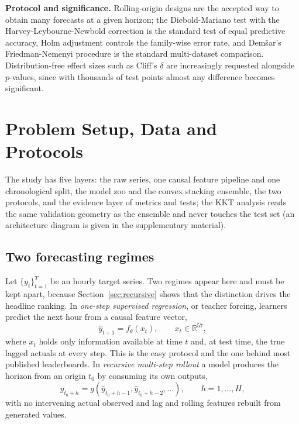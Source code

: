 \documentclass[journal]{IEEEtran}
\newif\iffullversion
\begin{document}
\textbf{Protocol and significance.} Rolling-origin designs \cite{r27} are the accepted way to obtain many forecasts at a given horizon; the Diebold-Mariano test \cite{r22} with the Harvey-Leybourne-Newbold correction \cite{r23} is the standard test of equal predictive accuracy, Holm adjustment \cite{r26} controls the family-wise error rate, and Dem\v{s}ar's Friedman-Nemenyi procedure \cite{r24} is the standard multi-dataset comparison. Distribution-free effect sizes such as Cliff's $\delta$ \cite{r25} are increasingly requested alongside $p$-values, since with thousands of test points almost any difference becomes significant.

\iffullversion\fi

\section{Problem Setup, Data and Protocols}
\label{sec:setup}
\iffullversion Fig.~\ref{fig:arch} gives the architecture of the study. Panel (a) shows the five layers, from the raw series to the evidence, with the object that passes between them on each arrow; no arrow carries test data backwards. Panel (b) opens the convex stacking ensemble and the KKT analysis that reads the same validation geometry.\else The study has five layers: the raw series, one causal feature pipeline and one chronological split, the model zoo and the convex stacking ensemble, the two protocols, and the evidence layer of metrics and tests; the KKT analysis reads the same validation geometry as the ensemble and never touches the test set (an architecture diagram is given in the supplementary material).\fi

\subsection{Two forecasting regimes}
\label{sec:regimes}
Let $\{y_t\}_{t=1}^{T}$ be an hourly target series. Two regimes appear here and must be kept apart, because Section~\ref{sec:recursive} shows that the distinction drives the headline ranking. In \emph{one-step supervised regression}, or teacher forcing, learners predict the next hour from a causal feature vector,
\begin{equation}
\hat{y}_{t+1} = f_{\theta}(x_t), \qquad x_t \in \mathbb{R}^{57},
\label{eq:onestep}
\end{equation}
where $x_t$ holds only information available at time $t$ and, at test time, the true lagged actuals at every step. This is the easy protocol and the one behind most published leaderboards. In \emph{recursive multi-step rollout} a model produces the horizon from an origin $t_0$ by consuming its own outputs,
\begin{equation}
\hat{y}_{t_0+h} = g\!\left(\hat{y}_{t_0+h-1}, \hat{y}_{t_0+h-2}, \ldots\right), \qquad h = 1, \ldots, H,
\label{eq:recursive}
\end{equation}
with no intervening actual observed and lag and rolling features rebuilt from generated values.
\end{document}
